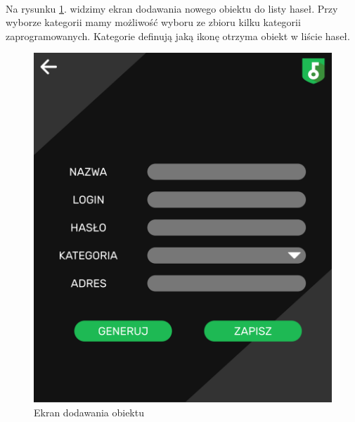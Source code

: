 \documentclass[a4paper]{article}
\begin{document}
\paragraph{}Na rysunku \ref{fig:hasłoDodaj}. widzimy ekran dodawania nowego obiektu do listy haseł. Przy wyborze kategorii mamy możliwość wyboru ze zbioru kilku kategorii zaprogramowanych. Kategorie definują jaką ikonę otrzyma obiekt w liście haseł.
\begin{figure}[H]
    \centering
    \includegraphics[height=1\textwidth]{img/ekran_dodawania_hasla.png}
    \caption{Ekran dodawania obiektu}
    \label{fig:hasłoDodaj}
\end{figure}

\newpage
\end{document}
